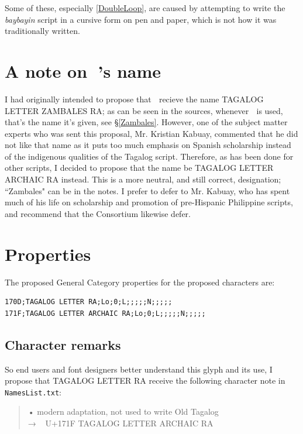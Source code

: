 \documentclass[a4paper,pagesize,openany,14pt,parskip=never]{scrbook}
\newcommand{\≈}{$\approx$}
\begin{document}
Some of these, especially \textnumero\ref{DoubleLoop}, are caused by attempting to write the {\em baybayin} script in a cursive form on pen and paper, which is not how it was traditionally written.

\section{A note on {\baybayinh ᜍ}'s name}

I had originally intended to propose that {\baybayinh ᜍ} recieve the name \textsf{TAGALOG LETTER ZAMBALES RA}; as can be seen in the sources, whenever {\baybayinh ᜍ} is used, that's the name it's given, see \S\ref{Zambales}. However, one of the subject matter experts who was sent this proposal, Mr. Kristian Kabuay, commented that he did not like that name as it puts too much emphasis on Spanish scholarship instead of the indigenous qualities of the Tagalog script. Therefore, as has been done for other scripts, I decided to propose that the name be \textsf{TAGALOG LETTER ARCHAIC RA} instead. This is a more neutral, and still correct, designation; ``Zambales" can be in the notes. I prefer to defer to Mr. Kabuay, who has spent much of his life on scholarship and promotion of pre-Hispanic Philippine scripts, and recommend that the Consortium likewise defer.

\section{Properties}
The proposed General Category properties for the proposed characters are:

\begin{verbatim}
170D;TAGALOG LETTER RA;Lo;0;L;;;;;N;;;;;
171F;TAGALOG LETTER ARCHAIC RA;Lo;0;L;;;;;N;;;;;
\end{verbatim}

\subsection{Character remarks}

So end users and font designers better understand this glyph and its use, I propose that \textsf{TAGALOG LETTER RA} receive the following character note in \texttt{NamesList.txt}:

\begin{quote}
    • modern adaptation, not used to write Old Tagalog \\
    → {\baybayinh ᜍ}\ U+171F \textsf{TAGALOG LETTER ARCHAIC RA}
\end{quote}
\end{document}
